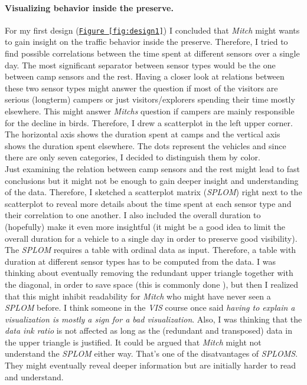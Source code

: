 \documentclass{article}
\begin{document}
\paragraph{Visualizing behavior inside the preserve.}
For my first design (\texttt{\hyperref[fig:design1]{Figure~\ref{fig:design1}}}) I concluded that \textit{Mitch} might wants to gain insight on the traffic behavior inside the preserve. Therefore, I tried to find possible correlations between the time spent at different sensors over a single day. The most significant separator between sensor types would be the one between camp sensors and the rest. Having a closer look at relations between these two sensor types might answer the question if most of the visitors are serious (longterm) campers or just visitors/explorers spending their time mostly elsewhere. This might answer \textit{Mitchs} question if campers are mainly responsible for the decline in birds. Therefore, I drew a scatterplot in the left upper corner. The horizontal axis shows the duration spent at camps and the vertical axis shows the duration spent elsewhere. The dots represent the vehicles and since there are only seven categories, I decided to distinguish them by color.\\
Just examining the relation between camp sensors and the rest might lead to fast conclusions but it might not be enough to gain deeper insight and understanding of the data. Therefore, I sketched a scatterplot matrix (\textit{SPLOM}) right next to the scatterplot to reveal more details about the time spent at each sensor type and their correlation to one another. I also included the overall duration to (hopefully) make it even more insightful (it might be a good idea to limit the overall duration for a vehicle to a single day in order to preserve good visibility). The \textit{SPLOM} requires a table with ordinal data as input. Therefore, a table with duration at different sensor types has to be computed from the data. I was thinking about eventually removing the redundant upper triangle together with the diagonal, in order to save space (this is commonly done \citep{munzner2015visualization}), but then I realized that this might inhibit readability for \textit{Mitch} who might have never seen a \textit{SPLOM} before. I think someone in the \textit{VIS} course once said \textit{having to explain a visualization is mostly a sign for a bad visualization}. Also, I was thinking that the \textit{data ink ratio} is not affected as long as the (redundant and transposed) data in the upper triangle is justified. It could be argued that \textit{Mitch} might not understand the \textit{SPLOM} either way. That's one of the disatvantages of \textit{SPLOMS}. They might eventually reveal deeper information but are initially harder to read and understand.\\
\end{document}
